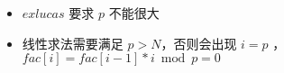 \documentclass[E:/GsjzTle/main/main.tex]{subfiles}
\begin{document}
\begin{itemize}
\item
  \(exlucas\) 要求 \(p\) 不能很大
\item
  线性求法需要满足 \(p > N\)，否则会出现 \(i = p\)
  ，\(fac[i] = fac[i - 1] * i\bmod p = 0\)
\end{itemize}
\end{document}
